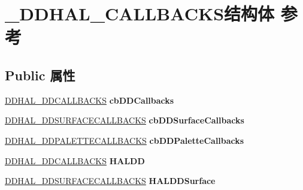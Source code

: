 \hypertarget{struct___d_d_h_a_l___c_a_l_l_b_a_c_k_s}{}\section{\+\_\+\+D\+D\+H\+A\+L\+\_\+\+C\+A\+L\+L\+B\+A\+C\+K\+S结构体 参考}
\label{struct___d_d_h_a_l___c_a_l_l_b_a_c_k_s}
\subsection*{Public 属性}
\begin{DoxyCompactItemize}
\item 
\mbox{\label{struct___d_d_h_a_l___c_a_l_l_b_a_c_k_s_aed4ac1b692c52a9144692d143ffe0981}} 
\hyperlink{struct___d_d_h_a_l___d_d_c_a_l_l_b_a_c_k_s}{D\+D\+H\+A\+L\+\_\+\+D\+D\+C\+A\+L\+L\+B\+A\+C\+KS} {\bfseries cb\+D\+D\+Callbacks}
\item 
\mbox{\label{struct___d_d_h_a_l___c_a_l_l_b_a_c_k_s_a0897460c188081c4f55cd28dd84e3363}} 
\hyperlink{struct___d_d_h_a_l___d_d_s_u_r_f_a_c_e_c_a_l_l_b_a_c_k_s}{D\+D\+H\+A\+L\+\_\+\+D\+D\+S\+U\+R\+F\+A\+C\+E\+C\+A\+L\+L\+B\+A\+C\+KS} {\bfseries cb\+D\+D\+Surface\+Callbacks}
\item 
\mbox{\label{struct___d_d_h_a_l___c_a_l_l_b_a_c_k_s_a62829a349f08c7376ff79f40e901c7b3}} 
\hyperlink{struct___d_d_h_a_l___d_d_p_a_l_e_t_t_e_c_a_l_l_b_a_c_k_s}{D\+D\+H\+A\+L\+\_\+\+D\+D\+P\+A\+L\+E\+T\+T\+E\+C\+A\+L\+L\+B\+A\+C\+KS} {\bfseries cb\+D\+D\+Palette\+Callbacks}
\item 
\mbox{\label{struct___d_d_h_a_l___c_a_l_l_b_a_c_k_s_a8b95acd62347916fbe81819d1e08ecd8}} 
\hyperlink{struct___d_d_h_a_l___d_d_c_a_l_l_b_a_c_k_s}{D\+D\+H\+A\+L\+\_\+\+D\+D\+C\+A\+L\+L\+B\+A\+C\+KS} {\bfseries H\+A\+L\+DD}
\item 
\mbox{\label{struct___d_d_h_a_l___c_a_l_l_b_a_c_k_s_a64637b9aa008ef7bd6ff42d7946c25f9}} 
\hyperlink{struct___d_d_h_a_l___d_d_s_u_r_f_a_c_e_c_a_l_l_b_a_c_k_s}{D\+D\+H\+A\+L\+\_\+\+D\+D\+S\+U\+R\+F\+A\+C\+E\+C\+A\+L\+L\+B\+A\+C\+KS} {\bfseries H\+A\+L\+D\+D\+Surface}

\end{DoxyCompactItemize}
